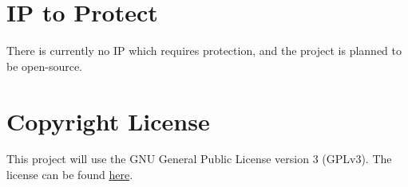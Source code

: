 \documentclass{article}
\begin{document}
\section{IP to Protect}

\begin{comment}
\wss{State whether there is IP to protect.  If there is, point to the agreement.
All students who are working on a project that requires an IP agreement are also
required to sign the ``Intellectual Property Guide Acknowledgement.''}
\end{comment}

There is currently no IP which requires protection, and the project is planned
to be open-source.

\section{Copyright License}

\begin{comment}
\wss{What copyright license is your team adopting.  Point to the license in your
repo.}
\end{comment}

This project will use the GNU General Public License version 3 (GPLv3). The
license can be found \href{https://github.com/VirochaanRG/MES-Event-Management-System/blob/main/LICENSE}{here}.
\end{document}
